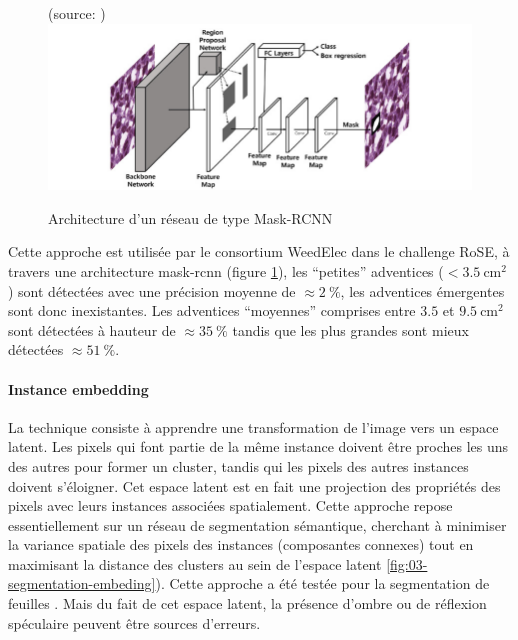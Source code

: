 \documentclass[../thesis.tex]{subfiles}
\begin{document}
    \begin{figure}[H]
        \centering
        {\scriptsize (source: \cite{Jung2019})} \\
        \includegraphics[width=\linewidth]{img/biblio/segmentation-mask-rcnn}
        \caption{Architecture d'un réseau de type Mask-RCNN}
        \label{fig:03-segmentation-mask-rcnn}
    \end{figure}
    
    Cette approche est utilisée par le consortium WeedElec \cite{champ:hal-02910844} dans le challenge RoSE, à travers une architecture mask-rcnn (figure \ref{fig:03-segmentation-mask-rcnn}), les ``petites'' adventices ($<\SI{3.5}{\cm^2}$) sont détectées avec une précision moyenne de $\approx \SI{2}{\percent}$, les adventices émergentes sont donc inexistantes. Les adventices ``moyennes'' comprises entre $3.5$ et $\SI{9.5}{\cm^2}$ sont détectées à hauteur de $\approx \SI{35}{\percent}$ tandis que les plus grandes sont mieux détectées $\approx \SI{51}{\percent}$.
    
    \newpage
    \paragraph{Instance embedding} La technique consiste à apprendre une transformation de l'image vers un espace latent. Les pixels qui font partie de la même instance doivent être proches les uns des autres pour former un cluster, tandis qui les pixels des autres instances doivent s'éloigner. Cet espace latent est en fait une projection des propriétés des pixels avec leurs instances associées spatialement. Cette approche repose essentiellement sur un réseau de segmentation sémantique, cherchant à minimiser la variance spatiale des pixels des instances (composantes connexes) tout en maximisant la distance des clusters au sein de l'espace latent \ref{fig:03-segmentation-embeding}). Cette approche a été testée pour la segmentation de feuilles \cite{DBLP:journals/corr/abs-1708-02551, wu2020improving}. Mais du fait de cet espace latent, la présence d'ombre ou de réflexion spéculaire peuvent être sources d'erreurs.
    
\end{document}

